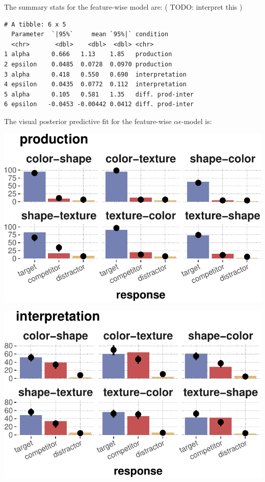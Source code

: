 \documentclass{article}
\begin{document}
The summary stats for the feature-wise model are: ( { TODO: interpret
this })

\begin{verbatim}
# A tibble: 6 x 5
  Parameter  `|95%`     mean `95%|` condition
  <chr>       <dbl>    <dbl>  <dbl> <chr>
1 alpha      0.666   1.13    1.85   production
2 epsilon    0.0485  0.0728  0.0970 production
3 alpha      0.418   0.550   0.690  interpretation
4 epsilon    0.0435  0.0772  0.112  interpretation
5 alpha      0.105   0.581   1.35   diff. prod-inter
6 epsilon   -0.0453 -0.00442 0.0412 diff. prod-inter
\end{verbatim}

The visual posterior predictive fit for the feature-wise
\(\alpha\epsilon\)-model is:

\includegraphics{00-pics/PPC-features-1.pdf}

\includegraphics{00-pics/PPC-features-2.pdf}
\end{document}
